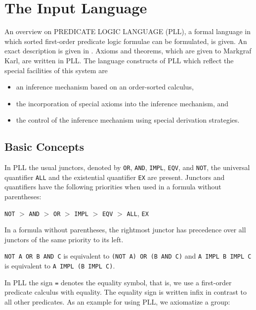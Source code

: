 \chapter{The Input Language}
\label{TheInputLanguage}


An overview on PREDICATE LOGIC LANGUAGE (PLL), a formal language in
which sorted   first-order
predicate logic formulae can be formulated, is given.  An exact
description is given in \cite{Walther82}. Axioms and theorems, which
are given to {\sc Markgraf Karl}, are written in PLL. The language
constructs of PLL which reflect the special facilities of this system
are

\begin{itemize}
\item 	an inference mechanism based on an order-sorted calculus, 
 
\item	the incorporation of special axioms into the inference mechanism, and
\item	the control of the inference mechanism using special derivation 
	strategies. 
\end{itemize}

\section{Basic Concepts}
\label{BasicConcepts}

In PLL the usual junctors, denoted by {\tt OR}, {\tt AND}, {\tt IMPL}, 
{\tt EQV}, and {\tt NOT}, the
universal quantifier {\tt ALL} and the existential quantifier {\tt EX} are present. 
Junctors and quantifiers have the following priorities when used in a 
formula without parentheses:

{\tt NOT} $>$ {\tt AND} $>$ {\tt OR} $>$ {\tt IMPL} $>$ {\tt EQV} $>$ 
{\tt ALL}, {\tt EX}


In a formula without parentheses, the rightmost junctor has precedence 
over all junctors of the same priority to its left.

\Ex

{\tt NOT A OR B AND C} is equivalent to {\tt (NOT A) OR (B AND C)} and {\tt A IMPL B IMPL 
C} is equivalent to {\tt A IMPL (B IMPL C)}. 

In PLL the sign {\tt =} denotes the equality symbol, that is, we use a first-order 
predicate calculus with equality. The equality sign is written infix in contrast to all other 
predicates. As an example for using PLL, we 
axiomatize a group:

